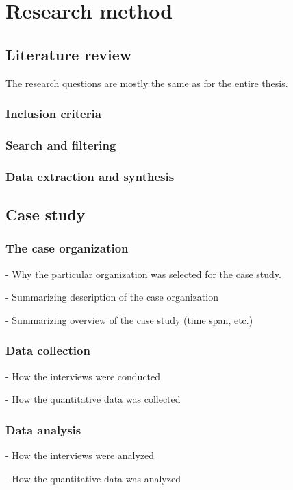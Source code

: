 
\chapter{Research method}
\label{chapter:method}


\section{Literature review}

The research questions are mostly the same as for the entire thesis.

\subsection{Inclusion criteria}

\subsection{Search and filtering}

\subsection{Data extraction and synthesis}



\section{Case study}

\subsection{The case organization}

- Why the particular organization was selected for the case study.

- Summarizing description of the case organization

- Summarizing overview of the case study (time span, etc.)


\subsection{Data collection}

- How the interviews were conducted

- How the quantitative data was collected

\subsection{Data analysis}

- How the interviews were analyzed

- How the quantitative data was analyzed
